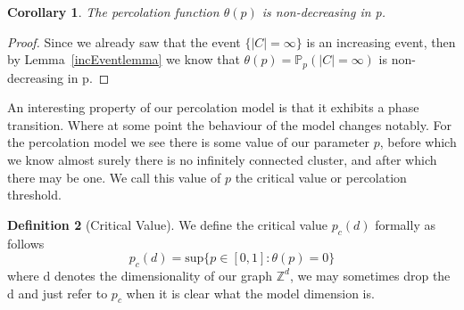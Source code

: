 \documentclass[a4paper,11pt]{article}
\newtheorem{theorem}{Theorem}[section]
\newtheorem{lemma}[theorem]{Lemma}
\newtheorem{corollary}[theorem]{Corollary}
\theoremstyle{definition}
\newtheorem{definition}[theorem]{Definition}
\newcommand{\ints}{\mathbb{Z}}
\newcommand{\prob}{\mathbb{P}_p}
\begin{document}
\begin{corollary}
	The percolation function $\theta(p)$ is non-decreasing in p.
\end{corollary}

\begin{proof}
	Since we already saw that the event $\{|C| = \infty\}$ is an increasing event, then by Lemma~\ref{incEventlemma} we know that $\theta(p) = \prob(|C| = \infty)$ is non-decreasing in p.
\end{proof}

An interesting property of our percolation model is that it exhibits a phase transition. Where at some point the behaviour of the model changes notably.
For the percolation model we see there is some value of our parameter $p$, before which we know almost surely there is no infinitely connected cluster, and after which there may be one.
We call this value of $p$ the critical value or percolation threshold.
\begin{definition}[Critical Value]
	We define the critical value $p_c(d)$ formally as follows
	$$p_c(d) = \text{sup}\{p \in [0,1]: \theta(p)=0\} $$
	where d denotes the dimensionality of our graph $\ints^d$, we may sometimes drop the d and just refer to $p_c$ when it is clear what the model dimension is.
\end{definition}







\end{document}
